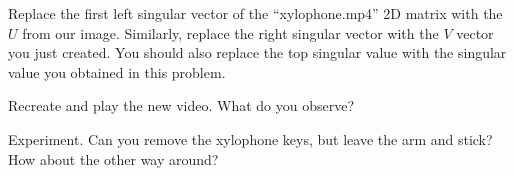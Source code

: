 Replace the first left singular vector of the ``xylophone.mp4'' 2D matrix with the $U$ from our image. Similarly, replace the right singular vector with the $V$ vector you just created. You should also replace the top singular value with the singular value you obtained in this problem.

Recreate and play the new video. What do you observe?

Experiment. Can you remove the xylophone keys, but leave the arm and stick? How about the other way around?



